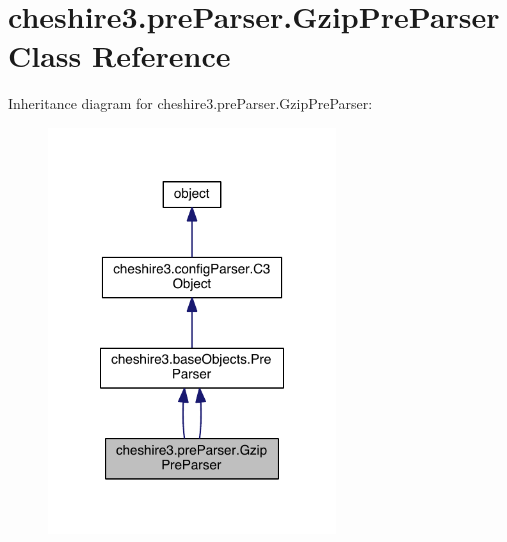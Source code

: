\hypertarget{classcheshire3_1_1pre_parser_1_1_gzip_pre_parser}{\section{cheshire3.\-pre\-Parser.\-Gzip\-Pre\-Parser Class Reference}
\label{classcheshire3_1_1pre_parser_1_1_gzip_pre_parser}
}


Inheritance diagram for cheshire3.\-pre\-Parser.\-Gzip\-Pre\-Parser\-:
\nopagebreak
\begin{figure}[H]
\begin{center}
\leavevmode
\includegraphics[width=216pt]{classcheshire3_1_1pre_parser_1_1_gzip_pre_parser__inherit__graph}
\end{center}
\end{figure}


